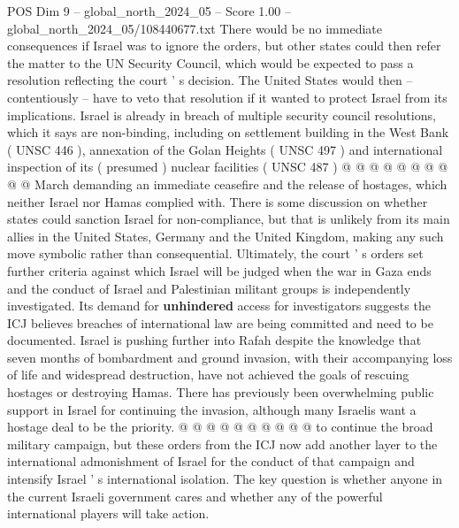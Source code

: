 \begin{textsample}{POS Dim 9 – global\_north\_2024\_05 – Score 1.00 – global\_north\_2024\_05/108440677.txt}
There would be no immediate consequences if Israel was to ignore the orders, but other states could then refer the matter to the UN Security Council, which would be expected to pass a resolution reflecting the court ' s decision.
The United States would then -- contentiously -- have to veto that resolution if it wanted to protect Israel from its implications.
Israel is already in breach of multiple security council resolutions, which it says are non-binding, including on settlement building in the West Bank ( UNSC 446 ), annexation of the Golan Heights ( UNSC 497 ) and international inspection of its ( presumed ) nuclear facilities ( UNSC 487 ) @ @ @ @ @ @ @ @ @ @ March demanding an immediate ceasefire and the release of hostages, which neither Israel nor Hamas complied with.
There is some discussion on whether states could sanction Israel for non-compliance, but that is unlikely from its main allies in the United States, Germany and the United Kingdom, making any such move symbolic rather than consequential.
Ultimately, the court ' s orders set further criteria against which Israel will be judged when the war in Gaza ends and the conduct of Israel and Palestinian militant groups is independently investigated.
Its demand for \textbf{unhindered} access for investigators suggests the ICJ believes breaches of international law are being committed and need to be documented.
Israel is pushing further into Rafah despite the knowledge that seven months of bombardment and ground invasion, with their accompanying loss of life and widespread destruction, have not achieved the goals of rescuing hostages or destroying Hamas.
There has previously been overwhelming public support in Israel for continuing the invasion, although many Israelis want a hostage deal to be the priority. @ @ @ @ @ @ @ @ @ @ to continue the broad military campaign, but these orders from the ICJ now add another layer to the international admonishment of Israel for the conduct of that campaign and intensify Israel ' s international isolation.
The key question is whether anyone in the current Israeli government cares and whether any of the powerful international players will take action.

\end{textsample}
